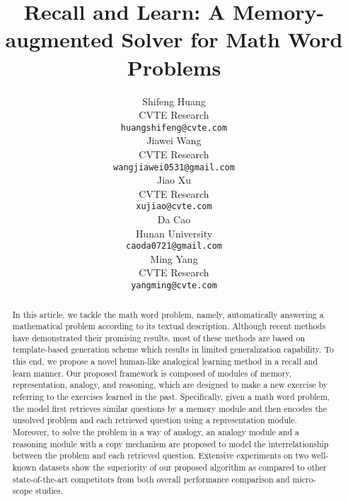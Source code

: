 \documentclass[11pt, a4paper]{article}
\begin{document}
\title{Recall and Learn: A Memory-augmented Solver for Math Word Problems}

\author{Shifeng Huang \footnotemark[1] \\
 CVTE Research \\
 \texttt{huangshifeng@cvte.com} \\ \And
 Jiawei Wang \footnotemark[1] \footnotemark[2] \\ 
 CVTE Research \\
 \texttt{wangjiawei0531@gmail.com} \\ \AND
 Jiao Xu \\
 CVTE Research \\
 \texttt{xujiao@cvte.com} \\ \And
 Da Cao \\ 
 Hunan University \\ 
 \texttt{caoda0721@gmail.com} \\ \And
 Ming Yang \\
 CVTE Research \\
 \texttt{yangming@cvte.com}
 }
  
\maketitle

\renewcommand{\thefootnote}{\fnsymbol{footnote}}   

\renewcommand{\thefootnote}{\arabic{footnote}}
\setcounter{footnote}{0}

\begin{abstract}
In this article, we tackle the math word problem, namely, automatically answering a mathematical problem according to its textual description. Although recent methods have demonstrated their promising results, most of these methods are based on template-based generation scheme which results in limited generalization capability. To this end, we propose a novel human-like analogical learning method in a recall and learn manner. Our proposed framework is composed of modules of memory, representation, analogy, and reasoning, which are designed to make a new exercise by referring to the exercises learned in the past. Specifically, given a math word problem, the model first retrieves similar questions by a memory module and then encodes the unsolved problem and each retrieved question using a representation module. Moreover, to solve the problem in a way of analogy, an analogy module and a reasoning module with a copy mechanism are proposed to model the interrelationship between the problem and each retrieved question. Extensive experiments on two well-known datasets show the superiority of our proposed algorithm as compared to other state-of-the-art competitors from both overall performance comparison and micro-scope studies.
\end{abstract}
\end{document}
